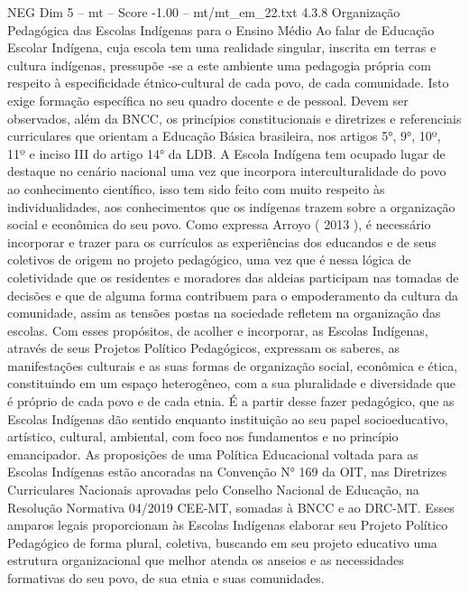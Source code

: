 \begin{textsample}{NEG Dim 5 – mt – Score -1.00 – mt/mt\_em\_22.txt}  \label{ex:f5_neg_206}
4.3.8 Organização Pedagógica das Escolas Indígenas para o Ensino Médio Ao falar de Educação Escolar Indígena, cuja escola tem uma realidade singular, inscrita em terras e cultura indígenas, pressupõe -se a este ambiente uma pedagogia própria com respeito à especificidade étnico-cultural de cada povo, de cada comunidade.
Isto exige formação específica no seu quadro docente e de pessoal.
Devem ser observados, além da BNCC, os princípios constitucionais e diretrizes e referenciais curriculares que orientam a Educação Básica brasileira, nos artigos 5{\EmojiFont °}, 9{\EmojiFont °}, 10º, 11º e inciso III do artigo 14{\EmojiFont °} da LDB.
A Escola Indígena tem ocupado lugar de destaque no cenário nacional uma vez que incorpora interculturalidade do povo ao conhecimento científico, isso tem sido feito com muito respeito às individualidades, aos conhecimentos que os indígenas trazem sobre a organização social e econômica do seu povo.
Como expressa Arroyo ( 2013 ), é necessário incorporar e trazer para os currículos as experiências dos educandos e de seus coletivos de origem no projeto pedagógico, uma vez que é nessa lógica de coletividade que os residentes e moradores das aldeias participam nas tomadas de decisões e que de alguma forma contribuem para o empoderamento da cultura da comunidade, assim as tensões postas na sociedade refletem na organização das escolas.
Com esses propósitos, de acolher e incorporar, as Escolas Indígenas, através de seus Projetos Político Pedagógicos, expressam os saberes, as manifestações culturais e as suas formas de organização social, econômica e ética, constituindo em um espaço heterogêneo, com a sua pluralidade e diversidade que é próprio de cada povo e de cada etnia.
É a partir desse fazer pedagógico, que as Escolas Indígenas dão sentido enquanto instituição ao seu papel socioeducativo, artístico, cultural, ambiental, com foco nos fundamentos e no princípio emancipador.
As proposições de uma Política Educacional voltada para as Escolas Indígenas estão ancoradas na Convenção N{\EmojiFont °} 169 da OIT, nas Diretrizes Curriculares Nacionais aprovadas pelo Conselho Nacional de Educação, na Resolução Normativa 04/2019 CEE-MT, somadas à BNCC e ao DRC-MT.
Esses amparos legais proporcionam às Escolas Indígenas elaborar seu Projeto Político Pedagógico de forma plural, coletiva, buscando em seu projeto educativo uma estrutura organizacional que melhor atenda os anseios e as necessidades formativas do seu povo, de sua etnia e suas comunidades.

\end{textsample}
